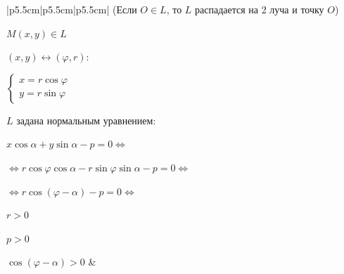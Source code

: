 \documentclass[twoside]{book}
\begin{document}
\begin{center}
\begin{longtable}[t]{|p{5.5cm}|p{5.5cm}|p{5.5cm}|}
        (Если \(O \in L\), то \(L\) распадается на 2 луча и точку \(O\))

        \(M(x, y) \in L\)

        \((x, y) \leftrightarrow (\varphi, r)\):

        \(
        \begin{cases}
            x = r \cos \varphi \\
            y = r \sin \varphi
        \end{cases}
        \)

        \(L\) задана нормальным уравнением:

        \small\(x \cos \alpha + y \sin \alpha - p = 0 \Leftrightarrow\)

        \scriptsize\(\Leftrightarrow r \cos \varphi \cos \alpha - r \sin \varphi \sin \alpha - p = 0 \Leftrightarrow\)

        \small\(\Leftrightarrow r \cos (\varphi - \alpha) - p = 0 \Leftrightarrow\)\normalsize


        \(r > 0\)

        \(p > 0\)

        \(\cos(\varphi - \alpha) > 0\)
         &
        \multicolumn{2}{p{11cm}}{

        Взаимное расположение прямой и плоскости в пространстве:

        \(\alpha: Ax + By + Cz + D = 0\), \(A^2 + B^2 + C^2 \neq 0\)

        \(L: \vec s = (l, m, n), M_0(x_0, y_0, z_0)\)

        \textbullet \(
        \left[\begin{array}{ll}
                  L \parallel \alpha \\
                  L \subset \alpha
              \end{array}\right .\)
        \(\Leftrightarrow \vec s \perp \vec N \Leftrightarrow \vec s \cdot \vec N = 0 \Leftrightarrow\)

        \(\)

        \(\Leftrightarrow Al + Bm + Cn = 0\)

        \textbullet \(L \subset \alpha \Leftrightarrow\)
        \(\begin{cases}
              \vec s \cdot \vec N = 0 \\
              M_0 \in \alpha
          \end{cases} \Leftrightarrow\)

}
\end{longtable}
\end{center}
\end{document}
